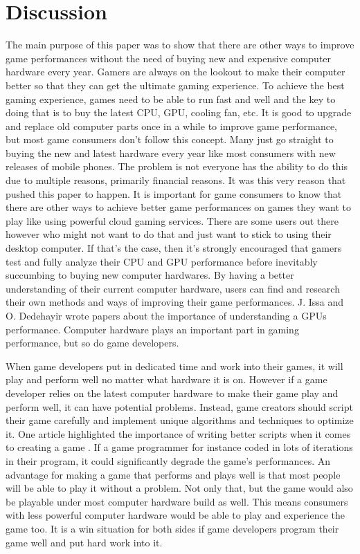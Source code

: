\documentclass{article}
\begin{document}
\section{Discussion}
The main purpose of this paper was to show that there are other ways to improve game performances without the need of buying new and expensive computer hardware every year. Gamers are always on the lookout to make their computer better so that they can get the  ultimate gaming experience. To achieve the best gaming experience, games need to be able to run fast and well and the key to doing that is to buy the latest CPU, GPU, cooling fan, etc. It is good to upgrade and replace old computer parts once in a while to improve game performance, but most game consumers don’t follow this concept. Many just go straight to buying the new and latest hardware every year like most consumers with new releases of mobile phones. The problem is not everyone has the ability to do this due to multiple reasons, primarily financial reasons. It was this very reason that pushed this paper to happen. It is important for game consumers to know that there are other ways to achieve better game performances on games they want to play like using powerful cloud gaming services. There are some users out there however who might not want to do that and just want to stick to using their desktop computer. If that’s the case, then it’s strongly encouraged that gamers test and fully analyze their CPU and GPU performance before inevitably succumbing to buying new computer hardwares. By having a better understanding of their current computer hardware, users can find and research their own methods and ways of improving their game performances. J. Issa \cite{6462883} and O. Dedehayir \cite{4737999} wrote papers about the importance of understanding a GPUs performance. Computer hardware plays an important part in gaming performance, but so do game developers.

When game developers put in dedicated time and work into their games, it will play and perform well no matter what hardware it is on. However if a game developer relies on the latest computer hardware to make their game play and perform well, it can have potential problems. Instead, game creators should script their game carefully and implement unique algorithms and techniques to optimize it. One article highlighted the importance of writing better scripts when it comes to creating a game \cite{10.1145/1483101.1483106}. If a game programmer for instance coded in lots of iterations in their program, it could significantly degrade the game’s performances. An advantage for making a game that performs and plays well is that most people will be able to play it without a problem. Not only that, but the game would also be playable under most computer hardware build as well. This means consumers with less powerful computer hardware would be able to play and experience the game too. It is a win situation for both sides if game developers program their game well and put hard work into it. 
\end{document}
